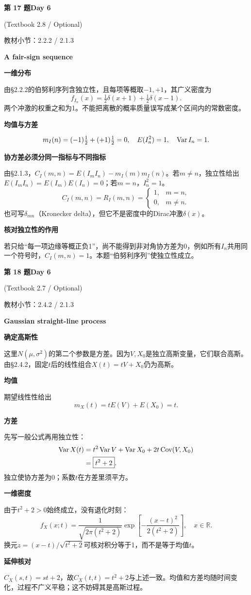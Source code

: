\documentclass[10.5pt,fontset=fandol]{ctexart}
\newcommand{\key}[1]{\par\vspace{4pt}\noindent\textbf{\color{navy}#1}\par\vspace{2pt}}
\newcommand{\qtitle}[2]{\par\addvspace{1.2em}\Needspace{8\baselineskip}\begin{tcolorbox}[colback=navy,colframe=navy,arc=1.5pt,boxrule=0pt]\color{white}\large\bfseries #1\hfill\small #2\end{tcolorbox}}
\begin{document}
\qtitle{第 17 题}{Day 6}
{\small\color{accentred}(Textbook 2.8 / Optional)}\par\smallskip
{\small\color{muted}教材小节：2.2.2 / 2.1.3}\par\medskip
\noindent\textbf{A fair-sign sequence}\par\smallskip\begin{tcolorbox}[breakable,colback=qbg,colframe=qbg,boxrule=0pt]\key{一维分布}
由§2.2.2的伯努利序列含独立性，且每项等概取$-1,+1$，其广义密度为
\[\boxed{f_{I_n}(x)=\tfrac12\delta(x+1)+\tfrac12\delta(x-1).}\]
两个冲激的权重之和为1。不能把离散的概率质量误写成某个区间内的常数密度。
\key{均值与方差}
\[m_I(n)=(-1)\tfrac12+(+1)\tfrac12=0,\quad E(I_n^2)=1,\quad\operatorname{Var} I_n=1.\]
\key{协方差必须分同一指标与不同指标}
由§2.1.3，$C_I(m,n)=E(I_mI_n)-m_I(m)m_I(n)$。若$m\ne n$，独立性给出$E(I_mI_n)=E(I_m)E(I_n)=0$；若$m=n$，$I_n^2=1$。
\[\boxed{C_I(m,n)=R_I(m,n)=\begin{cases}1,&m=n,\\0,&m\ne n.\end{cases}}\]
也可写$\delta_{mn}$（Kronecker delta），但它不是密度中的Dirac冲激$\delta(x)$。
\key{核对独立性的作用}
若只给“每一项边缘等概正负1”，尚不能得到非对角协方差为0，例如所有$I_n$共用同一个符号时，$C_I(m,n)=1$。本题“伯努利序列”使独立性成立。

\end{tcolorbox}
\qtitle{第 18 题}{Day 6}
{\small\color{accentred}(Textbook 2.7 / Optional)}\par\smallskip
{\small\color{muted}教材小节：2.4.2 / 2.1.3}\par\medskip
\noindent\textbf{Gaussian straight-line process}\par\smallskip\begin{tcolorbox}[breakable,colback=qbg,colframe=qbg,boxrule=0pt]\key{确定高斯性}
这里$N(\mu,\sigma^2)$的第二个参数是方差。因为$V,X_0$是独立高斯变量，它们联合高斯。由§2.4.2，固定$t$后的线性组合$X(t)=tV+X_0$仍为高斯。
\key{均值}
期望线性性给出
\[\boxed{m_X(t)=tE(V)+E(X_0)=t.}\]
\key{方差}
先写一般公式再用独立性：
\[\begin{aligned}\operatorname{Var} X(t)&=t^2\operatorname{Var} V+\operatorname{Var} X_0+2t\operatorname{Cov}(V,X_0)\\&=\boxed{t^2+2}.\end{aligned}\]
独立使协方差为0；系数$t$在方差里须平方。
\key{一维密度}
由于$t^2+2>0$始终成立，没有退化时刻：
\[\boxed{f_X(x;t)=\frac1{\sqrt{2\pi(t^2+2)}}\exp\!\left[-\frac{(x-t)^2}{2(t^2+2)}\right],\quad x\in\mathbb R.}\]
换元$z=(x-t)/\sqrt{t^2+2}$可核对积分等于1，而不是等于均值$t$。
\key{延伸核对}
$C_X(s,t)=st+2$，故$C_X(t,t)=t^2+2$与上述一致。均值和方差均随时间变化，过程不广义平稳；这不妨碍其是高斯过程。

\end{tcolorbox}
\end{document}

